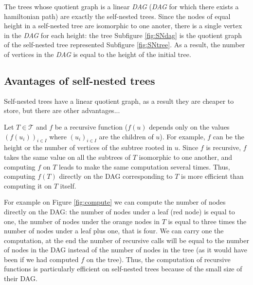 The trees whose quotient graph is a linear \emph{DAG} (\emph{DAG} for
which there exists a hamiltonian path) are exactly the self-nested
trees. Since the nodes of equal height in a self-nested tree are
isomorphic to one anoter, there is a single vertex in the \emph{DAG}
for each height: the tree Subfigure \ref{fig:SNdag} is the quotient
graph of the self-nested tree represented Subfigure
\ref{fig:SNtree}. As a result, the number of vertices in the
\emph{DAG} is equal to the height of the initial tree.

\subsection{Avantages of self-nested trees}

Self-nested trees have a linear quotient graph, as a result they are
cheaper to store, but there are other advantages...

Let $T \in \mathcal{T}$ and $f$ be a recursive function ($f(u)$ depends
only on the values $(f(u_{i}))_{i \in I}$ where $(u_{i})_{i \in I}$
are the children of $u$). For example, $f$ can be the height or the
number of vertices of the subtree rooted in $u$. Since $f$ is
recursive, $f$ takes the same value on all the subtrees of $T$
isomorphic to one another, and computing $f$ on $T$ leads to make the
same computation several times. Thus, computing $f(T)$ directly on the DAG
corresponding to $T$ is more efficient than computing it on $T$ itself.

For example on Figure \ref{fig:compute} we can compute the number of
nodes directly on the DAG: the number of nodes under a leaf (red node)
is equal to one, the number of nodes under the orange nodes in $T$ is
equal to three times the number of nodes under a leaf plus one, that
is four. We can carry one the computation, at the end the number of
recursive calls will be equal to the number of nodes in the DAG
instead of the number of nodes in the tree (as it would have been if
we had computed $f$ on the tree).  Thus, the computation of recursive
functions is particularly efficient on self-nested trees because of the
small size of their DAG.

